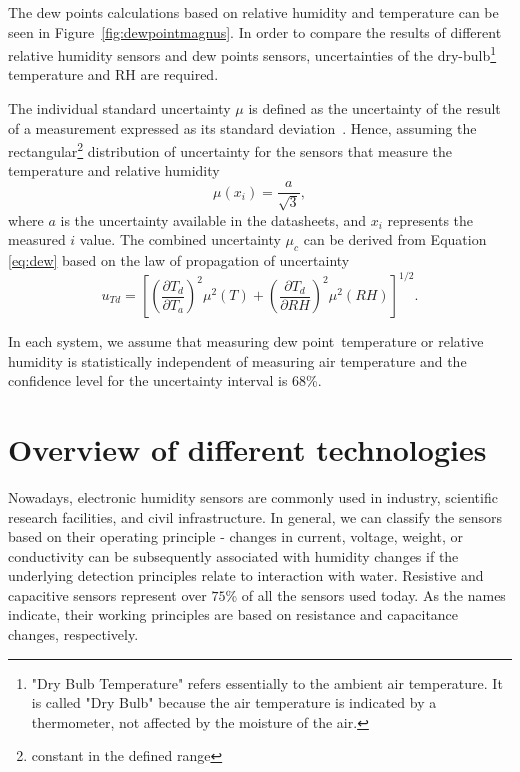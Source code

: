 The dew points calculations based on relative humidity and temperature can be seen in Figure~\ref{fig:dewpointmagnus}. In order to compare the results of different relative humidity sensors and dew points sensors, uncertainties of the dry-bulb\footnote{"Dry Bulb Temperature" refers essentially to the ambient air temperature. It is called "Dry Bulb" because the air temperature is indicated by a thermometer, not affected by the moisture of the air.} temperature and \gls{RH} are required.

The individual standard uncertainty $\mu$ is defined as the uncertainty of the result of a measurement expressed as its standard deviation~\cite{NIST_1994}. Hence, assuming the rectangular\footnote{constant in the defined range} distribution of uncertainty for the sensors that measure the temperature and relative humidity
\begin{equation}
    \mu(x_{i}) = \frac{a}{\sqrt{3}},
\end{equation}
where $a$ is the uncertainty available in the datasheets, and $x_{i}$ represents the measured $i$ value. The combined uncertainty $\mu_{c}$ can be derived from Equation \ref{eq:dew} based on the law of propagation of uncertainty~\cite{dp_uncertainty}
\begin{equation}
    u_{Td} = \left [  \left (\frac{\partial T_{d}}{\partial T_{a}}  \right )^{2} \mu^{2}(T) + \left (\frac{\partial T_{d}}{\partial RH}  \right )^{2} \mu^{2}(RH)\right ]^{1/2}.
    \label{dp_error}
\end{equation}

In each system, we assume that measuring dew point temperature or relative humidity is statistically independent of measuring air temperature and the confidence level for the uncertainty interval is 68\%.  

\section{Overview of different technologies}

Nowadays, electronic humidity sensors are commonly used in industry, scientific research facilities, and civil infrastructure. In general, we can classify the sensors based on their operating principle - changes in current, voltage, weight, or conductivity can be subsequently associated with humidity changes if the underlying detection principles relate to interaction with water. Resistive and capacitive sensors represent over $75$\% of all the sensors used today. As the names indicate, their working principles are based on resistance and capacitance changes, respectively.

